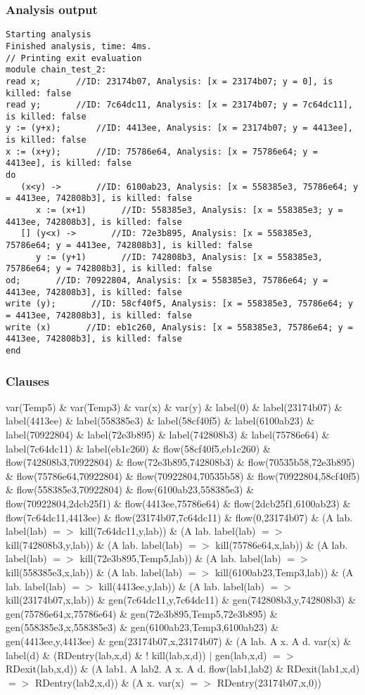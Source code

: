 \subsubsection{Analysis output}
\begin{lstlisting}
Starting analysis
Finished analysis, time: 4ms.
// Printing exit evaluation
module chain_test_2:
read x;       //ID: 23174b07, Analysis: [x = 23174b07; y = 0], is killed: false
read y;       //ID: 7c64dc11, Analysis: [x = 23174b07; y = 7c64dc11], is killed: false
y := (y+x);       //ID: 4413ee, Analysis: [x = 23174b07; y = 4413ee], is killed: false
x := (x+y);       //ID: 75786e64, Analysis: [x = 75786e64; y = 4413ee], is killed: false
do
   (x<y) ->       //ID: 6100ab23, Analysis: [x = 558385e3, 75786e64; y = 4413ee, 742808b3], is killed: false
      x := (x+1)       //ID: 558385e3, Analysis: [x = 558385e3; y = 4413ee, 742808b3], is killed: false
   [] (y<x) ->       //ID: 72e3b895, Analysis: [x = 558385e3, 75786e64; y = 4413ee, 742808b3], is killed: false
      y := (y+1)       //ID: 742808b3, Analysis: [x = 558385e3, 75786e64; y = 742808b3], is killed: false
od;       //ID: 70922804, Analysis: [x = 558385e3, 75786e64; y = 4413ee, 742808b3], is killed: false
write (y);       //ID: 58cf40f5, Analysis: [x = 558385e3, 75786e64; y = 4413ee, 742808b3], is killed: false
write (x)       //ID: eb1c260, Analysis: [x = 558385e3, 75786e64; y = 4413ee, 742808b3], is killed: false
end
\end{lstlisting}
\subsubsection{Clauses}
var(Temp5) \& var(Temp3) \& var(x) \& var(y) \& 
label(0) \& label(23174b07) \& label(4413ee) \& label(558385e3) \& label(58cf40f5) \& label(6100ab23) \& label(70922804) \& label(72e3b895) \& label(742808b3) \& label(75786e64) \& label(7c64dc11) \& label(eb1c260) \& 
flow(58cf40f5,eb1c260) \& flow(742808b3,70922804) \& flow(72e3b895,742808b3) \& flow(70535b58,72e3b895) \& flow(75786e64,70922804) \& flow(70922804,70535b58) \& flow(70922804,58cf40f5) \& flow(558385e3,70922804) \& flow(6100ab23,558385e3) \& flow(70922804,2dcb25f1) \& flow(4413ee,75786e64) \& flow(2dcb25f1,6100ab23) \& flow(7c64dc11,4413ee) \& flow(23174b07,7c64dc11) \& flow(0,23174b07) \& 
(A lab. label(lab) $=>$ kill(7c64dc11,y,lab)) \& (A lab. label(lab) $=>$ kill(742808b3,y,lab)) \& (A lab. label(lab) $=>$ kill(75786e64,x,lab)) \& (A lab. label(lab) $=>$ kill(72e3b895,Temp5,lab)) \& (A lab. label(lab) $=>$ kill(558385e3,x,lab)) \& (A lab. label(lab) $=>$ kill(6100ab23,Temp3,lab)) \& (A lab. label(lab) $=>$ kill(4413ee,y,lab)) \& (A lab. label(lab) $=>$ kill(23174b07,x,lab)) \& 
gen(7c64dc11,y,7c64dc11) \& gen(742808b3,y,742808b3) \& gen(75786e64,x,75786e64) \& gen(72e3b895,Temp5,72e3b895) \& gen(558385e3,x,558385e3) \& gen(6100ab23,Temp3,6100ab23) \& gen(4413ee,y,4413ee) \& gen(23174b07,x,23174b07) \& 
(A lab. A x. A d. var(x) \& label(d) \& (RDentry(lab,x,d) \& ! kill(lab,x,d)) $|$ gen(lab,x,d) $=>$ RDexit(lab,x,d)) \& 
(A lab1. A lab2. A x. A d. flow(lab1,lab2) \& RDexit(lab1,x,d) $=>$ RDentry(lab2,x,d)) \& 
(A x. var(x) $=>$ RDentry(23174b07,x,0))
